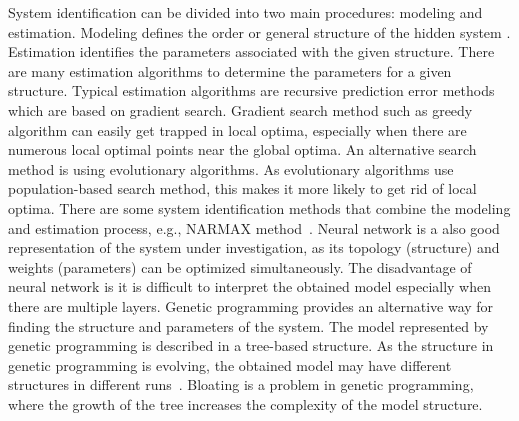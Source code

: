 System identification can be divided into two main procedures: modeling and estimation. Modeling defines the order or general structure of the hidden system \cite{Fogel_1991}. Estimation identifies the parameters associated with the given structure. There are many estimation algorithms to determine the parameters for a given structure. Typical estimation algorithms are recursive prediction error methods \cite{Ljungquist1993} which are based on gradient search. Gradient search method such as greedy algorithm can easily get trapped in local optima, especially when there are numerous local optimal points near the global optima. An alternative search method is using evolutionary algorithms. As evolutionary algorithms use population-based search method, this makes it more likely to get rid of local optima. There are some system identification methods that combine the modeling and estimation process, e.g., NARMAX method~\cite{Billings2013}. Neural network is a also good representation of the system under investigation, as its topology (structure) and weights (parameters) can be optimized simultaneously. The disadvantage of neural network is it is difficult to interpret the obtained model especially when there are multiple layers. Genetic programming provides an alternative way for finding the structure and parameters of the system. The model represented by genetic programming is described in a tree-based structure. As the structure in genetic programming is evolving, the obtained model may have different structures in different runs~\cite{Vladislavleva:2009}. Bloating \cite{Eiben2003} is a problem in genetic programming, where the growth of the tree increases the complexity of the model structure. 

